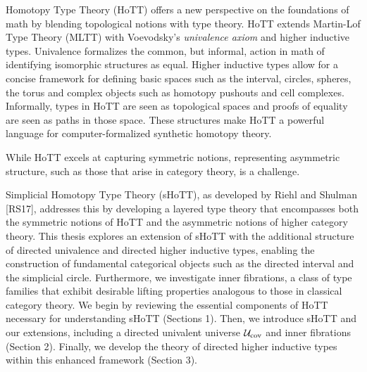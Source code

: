 \documentclass[main.tex]{subfiles}
\begin{document}
Homotopy Type Theory (HoTT) offers a new perspective on the foundations of math by blending topological notions with type theory.
HoTT extends Martin-Lof Type Theory (MLTT) with Voevodsky's \textit{univalence axiom} and higher inductive types. Univalence formalizes the common,
but informal, action in math of identifying isomorphic structures as equal. Higher inductive types allow for a concise framework
for defining basic spaces such as the interval, circles, spheres, the torus and complex objects such as homotopy pushouts and cell complexes.
Informally, types in HoTT are seen as topological spaces and proofs of equality are seen as paths in those space. These structures
 make HoTT a powerful language for computer-formalized synthetic homotopy theory.

While HoTT excels at capturing symmetric notions, representing asymmetric structure, such as those that arise in category theory,
is a challenge. 

Simplicial Homotopy Type Theory (sHoTT), as developed by Riehl and Shulman [RS17], addresses this by developing
a layered type theory that encompasses both the symmetric notions of HoTT and the asymmetric notions of higher category theory. This thesis explores an 
extension of sHoTT with the additional structure of directed univalence and directed higher 
inductive types, enabling the construction of fundamental categorical objects such as the directed interval and the simplicial circle. Furthermore, 
we investigate inner fibrations, a class of type families that exhibit desirable lifting properties analogous to those in classical category theory. 
We begin by reviewing the essential components of HoTT necessary for understanding sHoTT (Sections 1). Then, we introduce sHoTT and our
 extensions, including a directed univalent universe  $\mathcal{U}_\text{cov}$ and inner fibrations (Section 2). Finally, we develop the theory of directed higher inductive types
  within this enhanced framework (Section 3).
\end{document}
